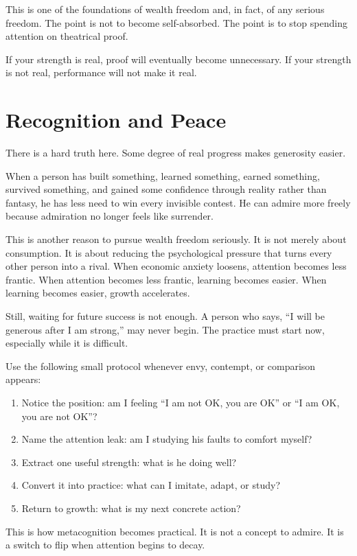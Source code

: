 This is one of the foundations of wealth freedom and, in fact, of any serious freedom. The point is not to become self-absorbed. The point is to stop spending attention on theatrical proof.

If your strength is real, proof will eventually become unnecessary. If your strength is not real, performance will not make it real.

\section*{Recognition and Peace}

There is a hard truth here. Some degree of real progress makes generosity easier.

When a person has built something, learned something, earned something, survived something, and gained some confidence through reality rather than fantasy, he has less need to win every invisible contest. He can admire more freely because admiration no longer feels like surrender.

This is another reason to pursue wealth freedom seriously. It is not merely about consumption. It is about reducing the psychological pressure that turns every other person into a rival. When economic anxiety loosens, attention becomes less frantic. When attention becomes less frantic, learning becomes easier. When learning becomes easier, growth accelerates.

Still, waiting for future success is not enough. A person who says, ``I will be generous after I am strong,'' may never begin. The practice must start now, especially while it is difficult.

Use the following small protocol whenever envy, contempt, or comparison appears:

\begin{enumerate}
\item Notice the position: am I feeling ``I am not OK, you are OK'' or ``I am OK, you are not OK''?
\item Name the attention leak: am I studying his faults to comfort myself?
\item Extract one useful strength: what is he doing well?
\item Convert it into practice: what can I imitate, adapt, or study?
\item Return to growth: what is my next concrete action?
\end{enumerate}

This is how metacognition becomes practical. It is not a concept to admire. It is a switch to flip when attention begins to decay.

